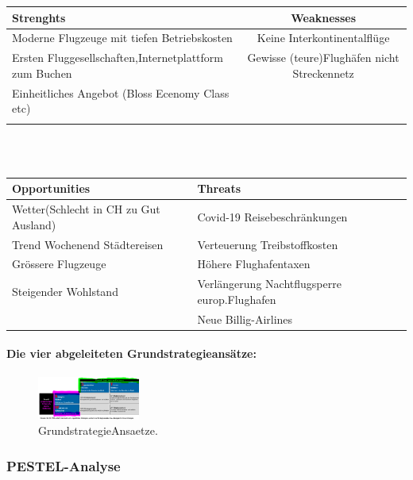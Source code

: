 \documentclass{article}
\begin{document}
\begin{tabular}{|l|c|}
\hline
\rule[-1ex]{0pt}{2.5ex} 
\textbf{Strenghts} & \textbf{Weaknesses} \\ 
\hline 
\rule[-1ex]{0pt}{2.5ex}
Moderne Flugzeuge mit tiefen Betriebskosten & Keine Interkontinentalflüge \\ 
\hline 
\rule[-1ex]{0pt}{2.5ex}
Ersten Fluggesellschaften,Internetplattform zum Buchen & Gewisse (teure)Flughäfen  nicht Streckennetz \\ 
\hline
\rule[-1ex]{0pt}{2.5ex} 
Einheitliches Angebot (Bloss Ecenomy Class etc) &  \\ 
\hline
\rule[-1ex]{0pt}{2.5ex}
\end{tabular} \\ \\


\begin{tabular}{|l|l|}
\hline 
\rule[-1ex]{0pt}{2.5ex}
\textbf{Opportunities} & \textbf{Threats} \\ 
\hline 
\rule[-1ex]{0pt}{2.5ex} Wetter(Schlecht in CH zu Gut Ausland) & Covid-19 Reisebeschränkungen \\ 
\hline 
\rule[-1ex]{0pt}{2.5ex} Trend Wochenend Städtereisen & Verteuerung Treibstoffkosten \\ 
\hline 
\rule[-1ex]{0pt}{2.5ex} Grössere Flugzeuge & Höhere Flughafentaxen \\ 
\hline 
\rule[-1ex]{0pt}{2.5ex} Steigender Wohlstand & Verlängerung Nachtflugsperre europ.Flughafen \\ 
\hline 
\rule[-1ex]{0pt}{2.5ex}  & Neue Billig-Airlines \\ 
\hline 
\end{tabular} 


\paragraph{Die vier abgeleiteten Grundstrategieansätze: \\}
\begin{figure}
\centering
\includegraphics[width=0.3\textwidth]{Resources/Image/GrundstrategieAnsaetze.png}
\caption{\label{fig:GrundstrategieAnsaetze}GrundstrategieAnsaetze.}
\end{figure}


\subsubsection{PESTEL-Analyse}
\end{document}
